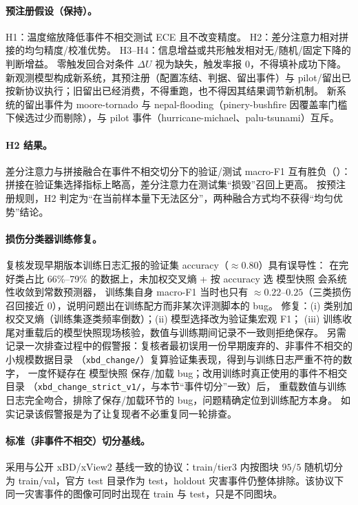 \paragraph{预注册假设（保持）。}
H1：温度缩放降低事件不相交测试 ECE 且不改变精度。
H2：差分注意力相对拼接的均匀精度/校准优势。
H3--H4：信息增益或共形触发相对无/随机/固定下降的判断增益。
零触发回合对条件 $\Delta U$ 视为缺失，触发率报 0，不得填补成功下降。
新观测模型构成新系统，其预注册（配置冻结、判据、留出事件）与 pilot/留出已按新协议执行；旧留出已经消费，不得重跑，也不得因其结果调节新机制。
新系统的留出事件为 moore-tornado 与 nepal-flooding（pinery-bushfire 因覆盖率门槛下候选过少而剔除），与 pilot 事件（hurricane-michael、palu-tsunami）互斥。

\paragraph{H2 结果。}
差分注意力与拼接融合在事件不相交切分下的验证/测试 macro-F1 互有胜负（）：
拼接在验证集选择指标上略高，差分注意力在测试集``损毁''召回上更高。
按预注册规则，H2 判定为``在当前样本量下无法区分''，两种融合方式均不获得``均匀优势''结论。

\paragraph{损伤分类器训练修复。}
复核发现早期版本训练日志汇报的验证集 accuracy（$\approx 0.80$）具有误导性：
在完好类占比 66\%--79\% 的数据上，未加权交叉熵 + 按 accuracy 选 模型快照 会系统性收敛到常数预测器，
训练集自身 macro-F1 当时也只有 $\approx 0.22$--$0.25$（三类损伤召回接近 0），说明问题出在训练配方而非某次评测脚本的 bug。
修复：(i) 类别加权交叉熵（训练集逐类频率倒数）；(ii) 模型选择改为验证集宏观 F1；
(iii) 训练收尾对重载后的模型快照现场核验，数值与训练期间记录不一致则拒绝保存。
另需记录一次排查过程中的假警报：复核者最初误用一份早期废弃的、非事件不相交的小规模数据目录
（\texttt{xbd\_change/}）复算验证集表现，得到与训练日志严重不符的数字，
一度怀疑存在 模型快照 保存/加载 bug；改用训练时真正使用的事件不相交目录
（\texttt{xbd\_change\_strict\_v1/}，与本节``事件切分''一致）后，
重载数值与训练日志完全吻合，排除了保存/加载环节的 bug，问题精确定位到训练配方本身。
如实记录该假警报是为了让复现者不必重复同一轮排查。

\paragraph{标准（非事件不相交）切分基线。}
采用与公开 xBD/xView2 基线一致的协议：train/tier3 内按图块 $95/5$ 随机切分为 train/val，官方 test 目录作为 test，holdout 灾害事件仍整体排除。该协议下同一灾害事件的图像可同时出现在 train 与 test，只是不同图块。

